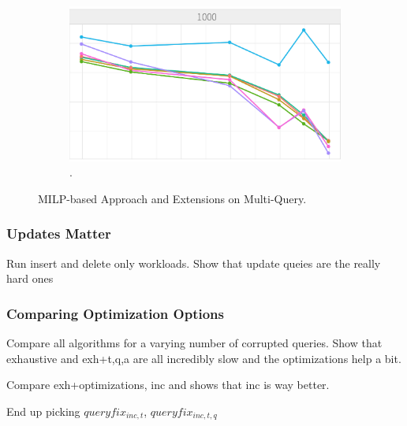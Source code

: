 {\begin{figure}[h]
\centering
  \begin{subfigure}[t]{.48\columnwidth}
  \includegraphics[width = .95\columnwidth]{figures/scale_allalgs}
  \caption{.}
  \label{f:multiquery} 
  \end{subfigure}
  \caption{MILP-based Approach and Extensions on Multi-Query. }
\end{figure}



\subsubsection{Updates Matter}
Run insert and delete only workloads.
Show that update queies are the really hard ones



\subsubsection{Comparing Optimization Options}

Compare all algorithms for a varying number of corrupted queries.
Show that exhaustive and exh+t,q,a are all incredibly slow and the optimizations help a bit.

Compare exh+optimizations, inc and shows that inc is way better.

End up picking $queryfix_{inc,t}$, $queryfix_{inc,t,q}$


%
% 
% 
% 
% 
% 
% 
% 
% 



}
